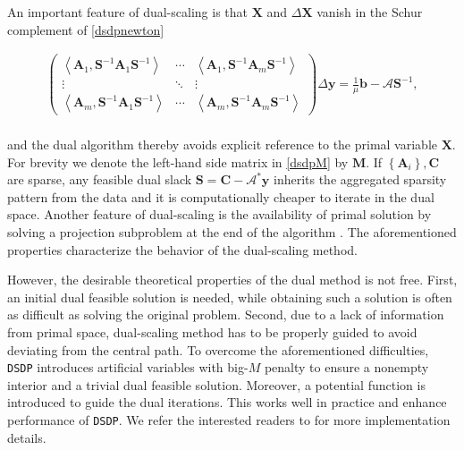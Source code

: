 An important feature of dual-scaling is that $\mathbf{X}$ and $\Delta \mathbf{X}$
vanish in the Schur complement of \eqref{dsdpnewton}

\begin{eqnarray} \label{dsdpM}
	\left(\begin{array}{ccc}
     \left\langle \mathbf{A}_1, \mathbf{S}^{- 1} \mathbf{A}_1 \mathbf{S}^{- 1} \right\rangle & \cdots &
     \left\langle \mathbf{A}_1, \mathbf{S}^{- 1} \mathbf{A}_m \mathbf{S}^{- 1} \right\rangle\\
     \vdots & \ddots & \vdots\\
     \left\langle \mathbf{A}_m, \mathbf{S}^{- 1} \mathbf{A}_1 \mathbf{S}^{- 1} \right\rangle & \cdots &
     \left\langle \mathbf{A}_m, \mathbf{S}^{- 1} \mathbf{A}_m \mathbf{S}^{- 1} \right\rangle
   \end{array}\right) \Delta \mathbf{y} = \frac{1}{\mu} \mathbf{b} - \mathcal{A} \mathbf{S}^{- 1},
\end{eqnarray}\\
and the dual algorithm thereby avoids explicit reference to the primal
variable $\mathbf{X}$. For brevity we denote the left-hand side matrix in \eqref{dsdpM} by $\mathbf{M}$.
If $\left\{ \mathbf{A}_i \right\}, \mathbf{C}$ are sparse, any feasible dual slack $\mathbf{S} = \mathbf{C}
-\mathcal{A}^{\ast} \mathbf{y}$ inherits the aggregated sparsity pattern from the data and it is
computationally cheaper to iterate in the dual space.
Another feature of dual-scaling is the availability of primal
solution by solving a projection subproblem at the end of the algorithm \cite{benson2008algorithm}. The
aforementioned properties characterize the behavior of the dual-scaling method.

However, the desirable theoretical properties of the dual method is not free.  First, an initial dual feasible solution is needed, while obtaining such a
solution is often as difficult as solving the original problem. Second, due to
a lack of information from primal space, dual-scaling method has to be properly guided to avoid deviating from the central path. 
To overcome the aforementioned difficulties, {{\texttt{DSDP}}}
introduces artificial variables with big-$M$ penalty to ensure a nonempty interior and a trivial dual feasible solution. Moreover, a potential function is introduced 
to guide the dual iterations. This works well in practice and enhance performance of {{\texttt{DSDP}}}. We refer the interested readers to
{\cite{benson2000solving, benson2008algorithm}} for more implementation details.

